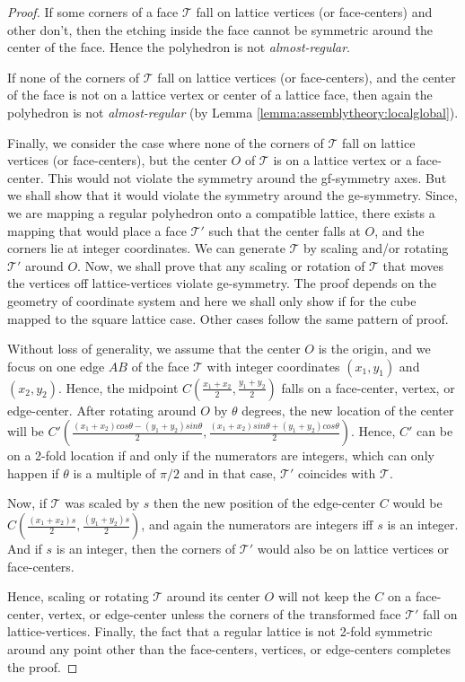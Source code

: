 \documentclass[11pt]{article}
\newcommand{\1}{\mathds{1}}
\begin{document}
\begin{proof}
 If some corners of a face $\mathcal{T}$ fall on lattice vertices (or face-centers) and other don't, then the etching inside the face cannot be symmetric around the center of the face. Hence the polyhedron is not \emph{almost-regular}.

 If none of the corners of $\mathcal{T}$ fall on lattice vertices (or face-centers), and the center of the face is not on a lattice vertex or center of a lattice face, then again the polyhedron is not \emph{almost-regular} (by Lemma \ref{lemma:assemblytheory:localglobal}). 

 Finally, we consider the case where none of the corners of $\mathcal{T}$ fall on lattice vertices (or face-centers), but the center $O$ of $\mathcal{T}$ is on a lattice vertex or a face-center. This would not violate the symmetry around the gf-symmetry axes. But we shall show that it would violate the symmetry around the ge-symmetry. Since, we are mapping a regular polyhedron onto a compatible lattice, there exists a mapping that would place a face $\mathcal{T}'$ such that the center falls at $O$, and the corners lie at integer coordinates. We can generate $\mathcal{T}$ by scaling and/or rotating $\mathcal{T}'$ around $O$. Now, we shall prove that any scaling or rotation of $\mathcal{T}$ that moves the vertices off lattice-vertices violate ge-symmetry. The proof depends on the geometry of coordinate system and here we shall only show if for the cube mapped to the square lattice case. Other cases follow the same pattern of proof.

 Without loss of generality, we assume that the center $O$ is the origin, and we focus on one edge $AB$ of the face $\mathcal{T}$ with integer coordinates $(x_1,y_1)$ and $(x_2,y_2)$. Hence, the midpoint $C(\frac{x_1+x_2}{2},\frac{y_1+y_2}{2})$ falls on a face-center, vertex, or edge-center. After rotating around $O$ by $\theta$ degrees, the new location of the center will be $C'(\frac{(x_1+x_2)cos\theta - (y_1+y_2)sin\theta}{2},\frac{(x_1+x_2)sin\theta + (y_1+y_2)cos\theta}{2})$. Hence, $C'$ can be on a 2-fold location if and only if the numerators are integers, which can only happen if $\theta$ is a multiple of $\pi/2$ and in that case, $\mathcal{T}'$ coincides with $\mathcal{T}$. 

 Now, if $\mathcal{T}$ was scaled by $s$ then the new position of the edge-center $C$ would be $C(\frac{(x_1+x_2)s}{2},\frac{(y_1+y_2)s}{2})$, and again the numerators are integers iff $s$ is an integer. And if $s$ is an integer, then the corners of $\mathcal{T}'$ would also be on lattice vertices or face-centers.

 Hence, scaling or rotating $\mathcal{T}$ around its center $O$ will not keep the $C$ on a face-center, vertex, or edge-center unless the corners of the transformed face $\mathcal{T}'$ fall on lattice-vertices. Finally, the fact that a regular lattice is not 2-fold symmetric around any point other than the face-centers, vertices, or edge-centers completes the proof.
\end{proof}
\end{document}
